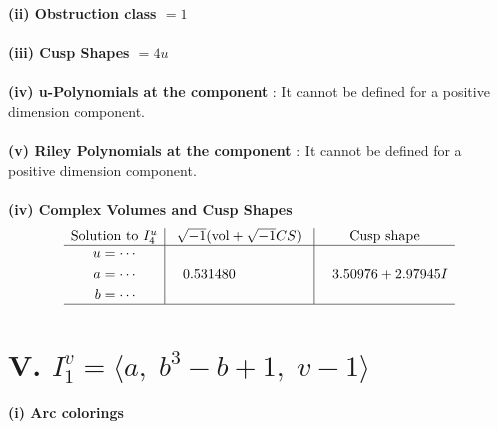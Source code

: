 \documentclass[1p]{elsarticle_modified}
\theoremstyle{definition}
\newcommand{\I}{\sqrt{-1}}
\begin{document}
\flushleft \textbf{(ii) Obstruction class $= 1$}\\~\\
\flushleft \textbf{(iii) Cusp Shapes $= 4 u$}\\~\\
\flushleft \textbf{(iv) u-Polynomials at the component} : It cannot be defined for a positive dimension component.\\~\\
\flushleft \textbf{(v) Riley Polynomials at the component} : It cannot be defined for a positive dimension component.\\~\\
\newpage\flushleft \textbf{(iv) Complex Volumes and Cusp Shapes}
$$\begin{array}{c|c|c} 
\text{Solution to }I^u_{4}& \I (\text{vol} + \sqrt{-1}CS) & \text{Cusp shape}\\
 \hline 
\begin{aligned}
u &= \cdots \\
a &= \cdots \\
b &= \cdots\end{aligned}
 & \phantom{-}0.531480\phantom{ +0.000000I} & \phantom{-}3.50976 + 2.97945 I\\
 \hline 
 \end{array}
$$\newpage\renewcommand{\arraystretch}{1}
\centering \section*{V. $I^v_{1}= \langle a,\;b^3- b+1,\;v-1 \rangle$}
\flushleft \textbf{(i) Arc colorings}\\
\end{document}
